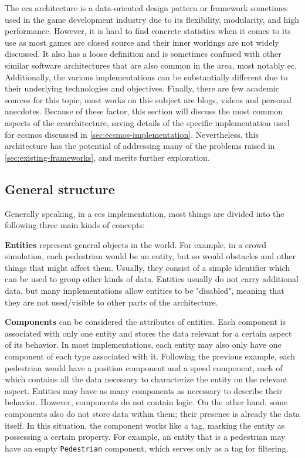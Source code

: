 \documentclass[twoside, 11pt]{article}
\begin{document}
The \gls{ecs} architecture is a data-oriented design pattern or framework sometimes used in the game development industry due to its flexibility, modularity, and high performance. However, it is hard to find concrete statistics when it comes to its use as most games are closed source and their inner workings are not widely discussed. It also has a loose definition and is sometimes confused with other similar software architectures that are also common in the area, most notably \gls{ec}. Additionally, the various implementations can be substantially different due to their underlying technologies and objectives. Finally, there are few academic sources for this topic, most works on this subject are blogs, videos and personal anecdotes. Because of these factor, this section will discuss the most common aspects of the \gls{ec}architecture, saving details of the specific implementation used for \gls{ecsmos} discussed in \autoref{sec:ecsmos-implementation}. Nevertheless, this architecture has the potential of addressing many of the problems raised in \autoref{sec:existing-frameworks}, and merits further exploration.

\subsection{General structure}

Generally speaking, in a \gls{ecs} implementation, most things are divided into the following three main kinds of concepts: 

\textbf{Entities} represent general objects in the world. For example, in a crowd simulation, each pedestrian would be an entity, but so would obstacles and other things that might affect them. Usually, they consist of a simple identifier which can be used to group other kinds of data. Entities usually do not carry additional data, but many implementations allow entities to be "disabled", meaning that they are not used/visible to other parts of the architecture.


\textbf{Components} can be considered the attributes of entities. Each component is associated with only one entity and stores the data relevant for a certain aspect of its behavior. In most implementations, each entity may also only have one component of each type associated with it. Following the previous example, each pedestrian would have a position component and a speed component, each of which contains all the data necessary to characterize the entity on the relevant aspect. Entities may have as many components as necessary to describe their behavior. However, components do not contain logic. On the other hand, some components also do not store data within them; their presence is already the data itself. In this situation, the component works like a tag, marking the entity as possessing a certain property. For example, an entity that is a pedestrian may have an empty \verb|Pedestrian| component, which serves only as a tag for filtering.
\end{document}
